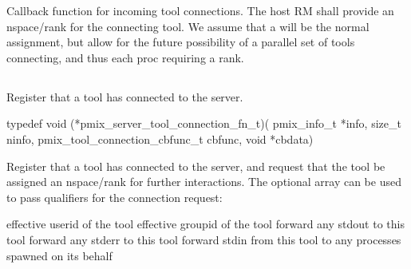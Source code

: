 \begin{arglist}
\end{arglist}

\descr

Callback function for incoming tool connections.
The host RM shall provide an nspace/rank for the connecting tool.
We assume that a  will be the normal assignment, but allow for the future possibility of a parallel set of tools connecting, and thus each proc requiring a rank.


\subsection{}

\summary

Register that a tool has connected to the server.

\format

\cspecificstart
\begin{codepar}
typedef void (*pmix_server_tool_connection_fn_t)(
                    pmix_info_t *info, size_t ninfo,
                    pmix_tool_connection_cbfunc_t cbfunc,
                    void *cbdata)
\end{codepar}
\cspecificend

\begin{arglist}
\end{arglist}


\descr

Register that a tool has connected to the server, and request that the tool be assigned an nspace/rank for further interactions.
The optional  array can be used to pass qualifiers for the connection request:

\begin{constantdesc}
%
 effective userid of the tool
%
 effective groupid of the tool
%
 forward any stdout to this tool
%
 forward any stderr to this tool
%
 forward stdin from this tool to any processes spawned on its behalf
%
\end{constantdesc}


